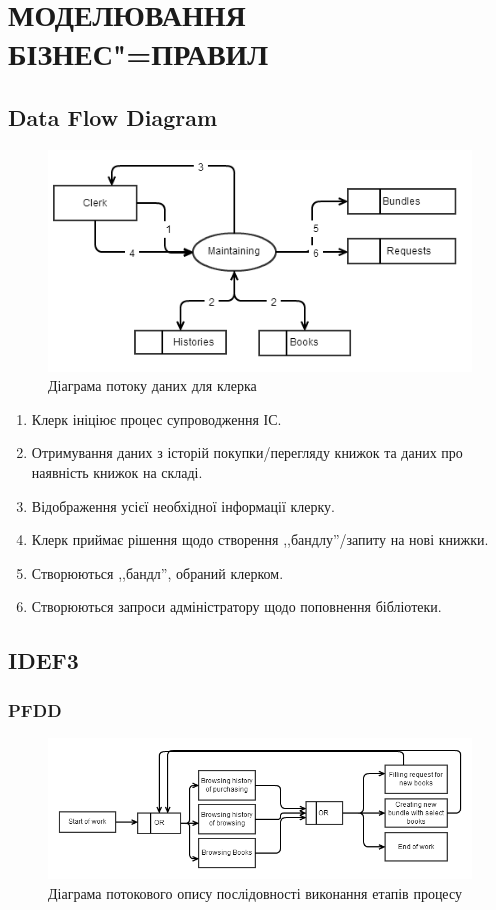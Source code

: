 \documentclass[a4paper,notitlepage,headsepline,pdftex,oneside]{report}
\newcommand{\setfontsize}[1]{\fontsize{#1pt}{#1pt}\selectfont}
\newcommand{\Chapter}[1]{\chapter{#1} \renewcommand{\baselinestretch}{1.5}\setfontsize{14pt}}
\newenvironment{enumerator}{\begin{enumerate}[leftmargin=1.6cm]%
  \setlength{\itemsep}{1pt}%
  \setlength{\parskip}{0pt}
  \setlength{\parsep}{0pt}
  }{\end{enumerate}}
\newcommand{\Section}[1]{\section{#1} \renewcommand{\baselinestretch}{1.5}\setfontsize{14pt}}
\newcommand{\Subsection}[1]{\subsection{#1} \renewcommand{\baselinestretch}{1.5}\setfontsize{14pt}}
\begin{document}
  \clearpage
\Chapter{МОДЕЛЮВАННЯ БІЗНЕС"=ПРАВИЛ}
  \Section{Data Flow Diagram}
    \begin{figure}[h]
      \centering
      \includegraphics{dfd.png}
      \caption{Діаграма потоку даних для клерка}
      \label{fig:dfd}
    \end{figure}
    \begin{enumerator}
      \item Клерк ініціює процес супроводження ІС.
      \item Отримування даних з історій покупки/перегляду книжок та даних про
        наявність книжок на складі.
      \item Відображення усієї необхідної інформації клерку.
      \item Клерк приймає рішення щодо створення ,,бандлу''/запиту на нові
        книжки.
      \item Створюються ,,бандл'', обраний клерком.
      \item Створюються запроси адміністратору щодо поповнення бібліотеки.
    \end{enumerator}
    \clearpage
  \Section{IDEF3}
    \Subsection{PFDD}
      \begin{figure}[h]
        \centering
        \includegraphics[scale=0.6]{pfdd.png}
        \caption{Діаграма потокового опису послідовності виконання етапів
        процесу}
        \label{fig:pfdd}
      \end{figure}
\end{document}
